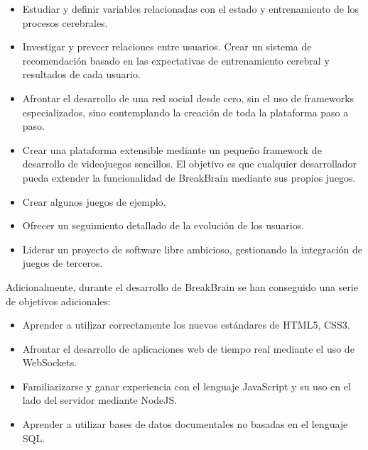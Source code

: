 \begin{itemize}
\item Estudiar y definir variables relacionadas con el estado y entrenamiento de los procesos cerebrales.
\item Investigar y preveer relaciones entre usuarios. Crear un sistema de recomendación basado en las expectativas de entrenamiento cerebral y resultados de cada usuario.
\item Afrontar el desarrollo de una red social desde cero, sin el uso de frameworks especializados, sino contemplando la creación de toda la plataforma paso a paso.
\item Crear una plataforma extensible mediante un pequeño framework de desarrollo de videojuegos sencillos. El objetivo es que cualquier desarrollador pueda extender la funcionalidad de BreakBrain mediante sus propios juegos.
\item Crear algunos juegos de ejemplo.
\item Ofrecer un seguimiento detallado de la evolución de los usuarios.
\item Liderar un proyecto de software libre ambicioso, gestionando la integración de juegos de terceros.
\end{itemize}

Adicionalmente, durante el desarrollo de BreakBrain se han conseguido una serie de objetivos adicionales:

\begin{itemize}
\item Aprender a utilizar correctamente los nuevos estándares de HTML5, CSS3.
\item Afrontar el desarrollo de aplicaciones web de tiempo real mediante el uso de WebSockets.
\item Familiarizarse y ganar experiencia con el lenguaje JavaScript y su uso en el lado del servidor mediante NodeJS.
\item Aprender a utilizar bases de datos documentales no basadas en el lenguaje SQL.
\end{itemize}



